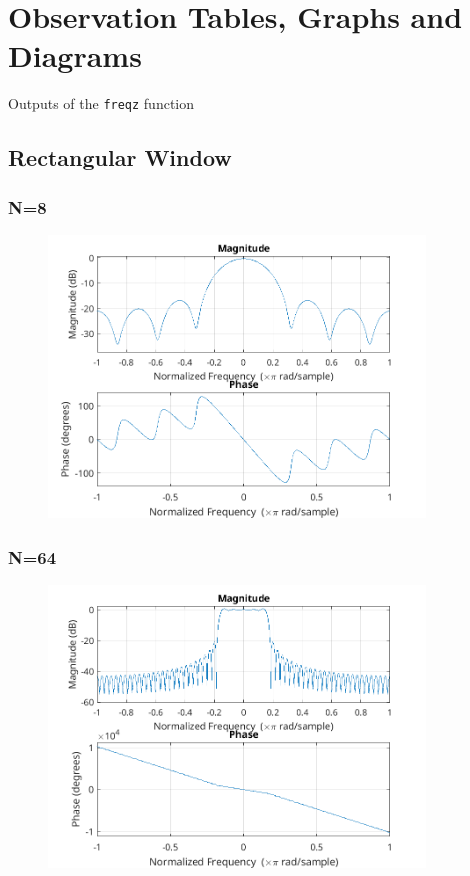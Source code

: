 \documentclass{article}
\begin{document}
\section{Observation Tables, Graphs and Diagrams}
Outputs of the \texttt{freqz} function
\subsection{Rectangular Window}
  \subsubsection{N=8}
  \begin{figure}[!ht]
  \includegraphics[width=10cm]{freqz_rect_8.png}
  \end{figure}
  \subsubsection{N=64}
  \begin{figure}[!ht]
  \includegraphics[width=10cm]{freqz_rect_64.png}
  \end{figure}
\end{document}
